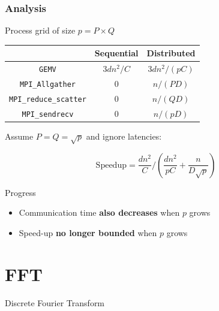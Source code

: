 \documentclass[xcolor={rgb,x11names,svgnames},rgb,x11names,svgnames]{beamer}
\begin{document}

\begin{frame}[label=2d]
  \frametitle{Analysis}

  Process grid of size $p = P \times Q$
  
  \begin{center}
    \begin{tabular}{|c||c|c|}
      \hline
      & Sequential & Distributed \\
      \hline\hline
      \texttt{GEMV}                 & $3 d n^2 / C$ & $3 d n^2 / (pC)$ \\
      \hline
      \texttt{MPI\_Allgather}       & 0             & $n / (PD)$ \\
      \hline
      \texttt{MPI\_reduce\_scatter} & 0             & $n / (QD)$ \\
      \hline
      \texttt{MPI\_sendrecv}        & 0             & $n / (pD)$ \\
      \hline
    \end{tabular}
  \end{center}

  Assume $P = Q = \sqrt{p}$ and \alert{ignore latencies}:
  
  \[
    \mathrm{Speedup} = \frac{d n^2}{C} / \left(\frac{d n^2}{pC} + \frac{n}{D\sqrt{p}}\right)
  \]

  \begin{alertblock}{Progress}
    \begin{itemize}
    \item Communication time \textbf{also decreases} when $p$ grows
    \item Speed-up \textbf{no longer bounded} when $p$ grows
    \end{itemize}
  \end{alertblock}  
\end{frame}

\section{FFT}

\begin{frame}
  \centering
  \vfill
  \Huge Discrete Fourier Transform
  \vfill
\end{frame}
\end{document}
